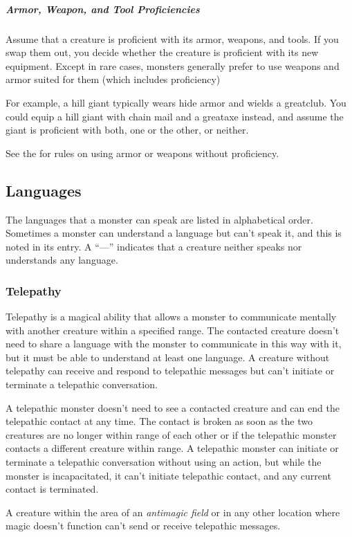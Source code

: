 \subparagraph*{Armor, Weapon, and Tool Proficiencies}

Assume that a creature is proficient with its armor, weapons, and tools. If you swap them out, you decide whether the creature is proficient with its new equipment. Except in rare cases, monsters generally prefer to use weapons and armor suited for them (which includes proficiency)

For example, a hill giant typically wears hide armor and wields a greatclub. You could equip a hill giant with chain mail and a greataxe instead, and assume the giant is proficient with both, one or the other, or neither.

See the  for rules on using armor or weapons without proficiency.

\subsection{Languages}

The languages that a monster can speak are listed in alphabetical order. Sometimes a monster can understand a language but can't speak it, and this is noted in its entry. A “—” indicates that a creature neither speaks nor understands any language.

\subsubsection{Telepathy}

Telepathy is a magical ability that allows a monster to communicate mentally with another creature within a specified range. The contacted creature doesn't need to share a language with the monster to communicate in this way with it, but it must be able to understand at least one language. A creature without telepathy can receive and respond to telepathic messages but can't initiate or terminate a telepathic conversation.

A telepathic monster doesn't need to see a contacted creature and can end the telepathic contact at any time. The contact is broken as soon as the two creatures are no longer within range of each other or if the telepathic monster contacts a different creature within range. A telepathic monster can initiate or terminate a telepathic conversation without using an action, but while the monster is incapacitated, it can't initiate telepathic contact, and any current contact is terminated.

A creature within the area of an \textit{antimagic field} or in any other location where magic doesn't function can't send or receive telepathic messages.

